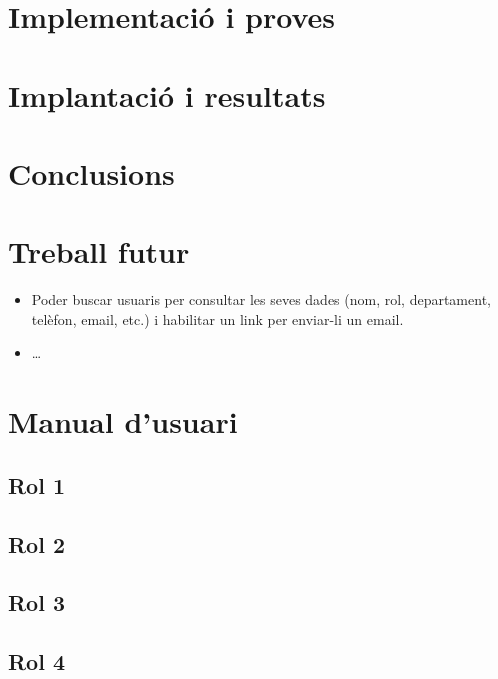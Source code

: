 \documentclass[a4paper,12pt]{ThesisStyle}
\begin{document}
\chapter{Implementació i proves}
\label{cap:implementacio}



\chapter{Implantació i resultats}
\label{cap:implantacio}



\chapter{Conclusions}
\label{cap:conclusions}



\chapter{Treball futur}
\label{cap:treball_futur}

\begin{itemize}
  \item Poder buscar usuaris per consultar les seves dades (nom, rol, departament, telèfon, email, etc.) i habilitar un link per enviar-li un email.
  \item \ldots
\end{itemize}


\backmatter





%

\chapter*{Manual d'usuari}

\section*{Rol 1}



\section*{Rol 2}



\section*{Rol 3}



\section*{Rol 4}
\end{document}
